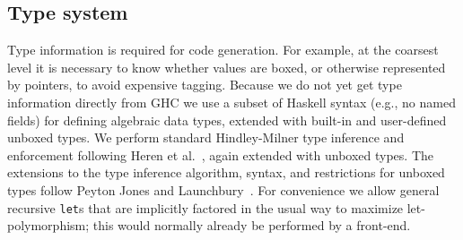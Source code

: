 \documentclass{llncs}
\begin{document}
\begin{comment}
For \emph{direct calls}, in which a known function is applied
to a number of arguments equal to its arity, \emph{stgApply} need not be
invoked: the \emph{FUN} is tail-called directly.


In addition to being in a tail call position, the GCC constraints for
generating a tail call (jump) are (approximately) that the total size of the
caller and callee arguments be equal, and the return type sizes be equal.  For
Clang the requirement is slightly more strict: caller and callee type
signatures must be the same.  These are a consequence of the C calling
convention that the caller, not callee, cleans up the stack (removes the
callee's stack frame).  However, because we maintain our own stack we can
define our own calling convention(s), so tail calls can be made to functions
of notionally differing type.  In particular, top-of-stack frames can be
adjusted in size and content without undue copying.
\end{comment}

\subsection{Type system}

Type information is required for code generation.  For example, at the
coarsest level it is necessary to know whether values are boxed, or otherwise
represented by pointers, to avoid expensive tagging.  Because we
do not yet get type information directly from GHC we use a subset of Haskell
syntax (e.g., no named fields) for defining algebraic data types, extended
with built-in and user-defined unboxed types.  We perform standard
Hindley-Milner type inference and enforcement following Heren et
al.~\cite{Heren02}, again extended with unboxed types.  The extensions to the
type inference algorithm, syntax, and restrictions for unboxed types follow
Peyton Jones and Launchbury~\cite{Jones:1991}.
For convenience we allow general recursive \texttt{let}s that are implicitly
factored in the usual way to maximize let-polymorphism; this would normally
already be performed by a front-end.
\begin{comment}
One would expect an automated STG generator such as GHC to factor recursive
\texttt{let} expressions into nested recursive and non-recursive \texttt{let}s
in the usual way to maximize let-polymorphism.  Because our STG is intended
to be somewhat convenient to write by hand we relax this constraint and perform
this transformation implicitly using a strongly-connected components algorithm
inspired by King and Launchbury~\cite{King:1995}.
\end{comment}
\end{document}
